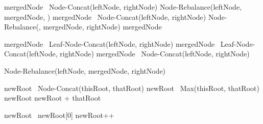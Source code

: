 \begin{listing}[ht!]
    \begin{algorithmic}


                \State mergedNode \la\ Node-Concat(leftNode, rightNode)
                \State \Return Node-Rebalance(leftNode, mergedNode, \nil{})
                \State mergedNode \la\ Node-Concat(leftNode, rightNode)
                \State \Return Node-Rebalance(\nil{}, mergedNode, rightNode)
            \Else
                \State mergedNode \la\ \nil{}

                    \State mergedNode \la\ Leaf-Node-Concat(leftNode, rightNode)
                \Else
                        \State mergedNode \la\ Leaf-Node-Concat(leftNode, rightNode)
                    \Else
                        \State mergedNode \la\ Node-Concat(leftNode, rightNode)
                    \EndIf
                \EndIf

                \State \Return Node-Rebalance(leftNode, mergedNode, rightNode)
            \EndIf

            \State \Return \nil{}
        \EndFunction

    \end{algorithmic}

    \begin{algorithmic}

            \State newRoot \la\ Node-Concat(thisRoot, thatRoot)
            \State newRoot \la\ Max(thisRoot, thatRoot)
            \State newRoot \la newRoot + thatRoot

                \State newRoot \la\ newRoot[0]
            \Else
                \State newRoot++
            \EndIf

            \State \Return \nil{}
        \EndFunction

    \end{algorithmic}
\end{listing}


